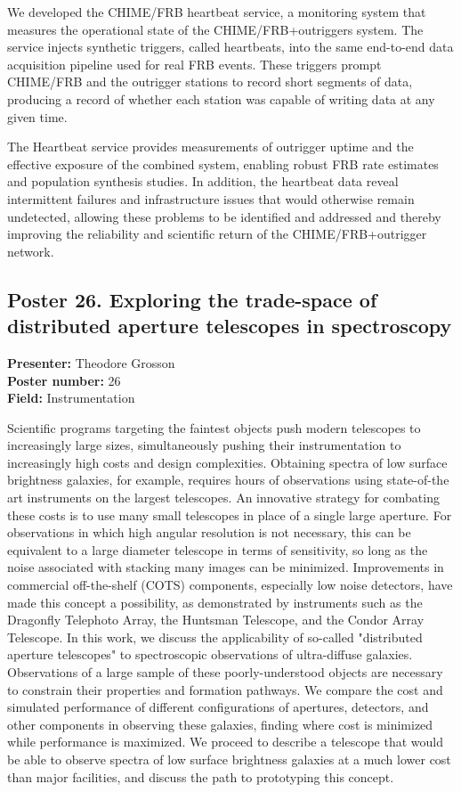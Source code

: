 We developed the CHIME/FRB heartbeat service, a monitoring system that measures the operational state of the CHIME/FRB+outriggers system. The service injects synthetic triggers, called heartbeats, into the same end-to-end data acquisition pipeline used for real FRB events. These triggers prompt CHIME/FRB and the outrigger stations to record short segments of data, producing a record of whether each station was capable of writing data at any given time.

The Heartbeat service provides measurements of outrigger uptime and the effective exposure of the combined system, enabling robust FRB rate estimates and population synthesis studies. In addition, the heartbeat data reveal intermittent failures and infrastructure issues that would otherwise remain undetected, allowing these problems to be identified and addressed and thereby improving the reliability and scientific return of the CHIME/FRB+outrigger network.

\hypertarget{poster-abstract-talk-148}{}\label{poster-abstract-page-talk-148}
\subsection*{Poster 26. Exploring the trade-space of distributed aperture telescopes in spectroscopy}
\textbf{Presenter:} Theodore Grosson\\
\textbf{Poster number:} 26\\
\textbf{Field:} Instrumentation

Scientific programs targeting the faintest objects push modern telescopes to increasingly large sizes, simultaneously pushing their instrumentation to increasingly high costs and design complexities. Obtaining spectra of low surface brightness galaxies, for example, requires hours of observations using state-of-the art instruments on the largest telescopes. An innovative strategy for combating these costs is to use many small telescopes in place of a single large aperture. For observations in which high angular resolution is not necessary, this can be equivalent to a large diameter telescope in terms of sensitivity, so long as the noise associated with stacking many images can be minimized. Improvements in commercial off-the-shelf (COTS) components, especially low noise detectors, have made this concept a possibility, as demonstrated by instruments such as the Dragonfly Telephoto Array, the Huntsman Telescope, and the Condor Array Telescope. In this work, we discuss the applicability of so-called "distributed aperture telescopes" to spectroscopic observations of ultra-diffuse galaxies. Observations of a large sample of these poorly-understood objects are necessary to constrain their properties and formation pathways. We compare the cost and simulated performance of different configurations of apertures, detectors, and other components in observing these galaxies, finding where cost is minimized while performance is maximized. We proceed to describe a telescope that would be able to observe spectra of low surface brightness galaxies at a much lower cost than major facilities, and discuss the path to prototyping this concept.

